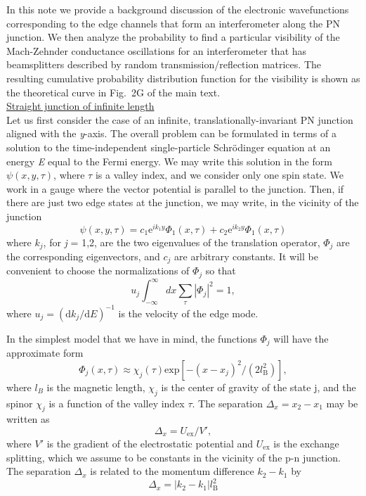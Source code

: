 \documentclass[%
reprint,amsmath,amssymb,aps,prl,superscriptaddress,
twocolumn
]{revtex4-1}
\begin{document}
		In this note we provide a background discussion of the electronic wavefunctions corresponding to the edge channels that form an interferometer along the PN junction. We then analyze the probability to find a particular visibility of the Mach-Zehnder conductance oscillations for an interferometer that has beamsplitters described by random transmission/reflection matrices. The resulting cumulative probability distribution function for the visibility is shown as the theoretical curve in Fig.~2G of the main text.\\
		
		\noindent \underline{Straight junction of infinite length}\\
		Let us first consider the case of an infinite, translationally-invariant PN junction aligned with the \emph{y}-axis. The overall problem can be formulated in terms of a solution to the time-independent single-particle Schr{\"o}dinger equation at an energy \emph{E} equal to the Fermi energy.  We may write this solution in the form $\psi (x,y,\tau)$, where $\tau$ is a valley index, and we consider only one spin state. We work in a gauge where the vector potential is parallel to the junction. Then, if there are just two edge states at the junction, we may write, in the vicinity of the junction
		\begin{equation}
		\psi (x,y,\tau) = c_1 \mathrm{e}^{ik_1y} \varPhi_1(x,\tau) + c_2 \mathrm{e}^{ik_2y} \varPhi_1(x,\tau)
		\end{equation}
		where $k_j$, for \emph{j} = 1,2, are the two eigenvalues of the translation operator, $\varPhi_j$ are the corresponding eigenvectors, and $c_j$ are arbitrary constants. It will be convenient to choose the normalizations of $\varPhi_j$ so that
		\begin{equation}
		u_j \int_{-\infty}^{\infty} dx \sum_{\tau} |\varPhi_j|^2 = 1,
		\end{equation}
		where $u_j = (\mathrm{d}k_j/\mathrm{d}E)^{-1}$ is the velocity of the edge mode.
		
		In the simplest model that we have in mind, the functions $\varPhi_j$ will have the approximate form
		\begin{equation}
		\varPhi_j (x,\tau) \approx \chi_j (\tau) \mathrm{exp} [-(x-x_j)^2/(2l_\mathrm{B}^2)],
		\end{equation}
		where $l_B$ is the magnetic length, $\chi_j$ is the center of gravity of the state j, and the spinor $\chi_j$ is a function of the valley index $\tau$. The separation $\Delta_x = x_2 - x_1$ may be written as
		\begin{equation}
		\Delta_x = U_{\mathrm{ex}}/V',
		\end{equation}
		where $V'$ is the gradient of the electrostatic potential and $U_\mathrm{ex}$ is the exchange splitting, which we assume to be constants in the vicinity of the p-n junction. The separation $\Delta_x$ is related to the momentum difference $k_2-k_1$ by
		\begin{equation}
		\Delta_x = |k_2-k_1|l^2_{\mathrm{B}}
		\end{equation}
		
\end{document}
